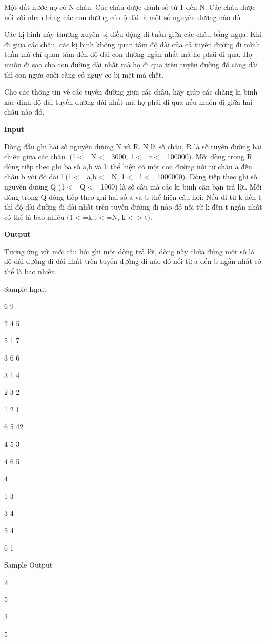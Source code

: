 



   Một đất nước nọ có N châu. Các châu được đánh số từ 1 đến N. Các châu được nối với nhau bằng các con đường có độ dài là một số nguyên dương nào đó.  

   Các kị binh này thường xuyên bị điều động đi tuần giữa các châu bằng ngựa. Khi đi giữa các châu, các kị binh không quan tâm độ dài của cả tuyến đường đi mình tuần mà chỉ quan tâm đến độ dài con đường ngắn nhất mà họ phải đi qua. Họ muốn đi sao cho con đường dài nhất mà họ đi qua trên tuyến đường đó càng dài thì con ngựa cưỡi càng có nguy cơ bị mệt mà chết.  

   Cho các thông tin về các tuyến đường giữa các châu, hãy giúp các chàng kị binh xác định độ dài tuyến đường dài nhất mà họ phải đi qua nếu muốn đi giữa hai châu nào đó.  

\textbf{    Input   }

   Dòng đầu ghi hai số nguyên dương N và R. N là số châu, R là số tuyến đường hai chiều giữa các châu. (1$<$=N$<$=3000, 1$<$=r$<$=100000). Mỗi dòng trong R dòng tiếp theo ghi ba số a,b và l: thể hiện có một con đường nối từ châu a đến châu b với độ dài l (1$<$=a,b$<$=N, 1$<$=l$<$=1000000). Dòng tiếp theo ghi số nguyên dương Q (1$<$=Q$<$=1000) là số câu mà các kị binh cần bạn trả lời. Mỗi dòng trong Q dòng tiếp theo ghi hai số a và b thể hiện câu hỏi: Nếu đi từ k đến t thì độ dài đường đi dài nhất trên tuyến đường đi nào đó nối từ k đến t ngắn nhất có thể là bao nhiêu (1$<$=k,t$<$=N, k$<$$>$t).  

\textbf{    Output   }

   Tương ứng với mỗi câu hỏi ghi một dòng trả lời, dòng này chứa đúng một số là độ dài đường đi dài nhất trên tuyến đường đi nào đó nối từ a đến b ngắn nhất có thể là bao nhiêu.  

   Sample Input  

   6 9  

   2 4 5  

   5 1 7  

   3 6 6  

   3 1 4  

   2 3 2  

   1 2 1  

   6 5 42  

   4 5 3  

   4 6 5  

   4  

   1 3  

   3 4  

   5 4  

   6 1  

   Sample Output  

   2  

   5  

   3  

   5  